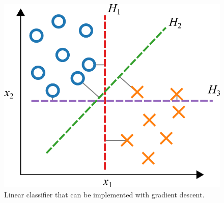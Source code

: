 \documentclass[12pt,letter]{article}
\begin{document}
\begin{figure}[H]
    \centering
    \includegraphics[]{../figures/x_y_plot_linear_classifier}
    \caption{Linear classifier that can be implemented with gradient descent.}
    \label{fig:x_y_plot_linear_classifier}
\end{figure}
\end{document}
